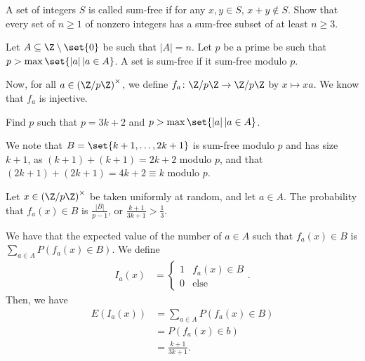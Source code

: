 \documentclass[10pt]{mypackage}
\begin{document}
\begin{problem}
  A set of integers $S$ is called sum-free if for any $x,y\in S$, $x+y\notin S$. Show that every set of $n\geq 1$ of nonzero integers has a sum-free subset of at least $n\geq 3$.
\end{problem}
\begin{solution}
  Let $A\subseteq \Z\setminus \set{0}$ be such that $\left\vert A \right\vert = n$. Let $p$ be a prime be such that $p > \max\set{\left\vert a \right\vert | a\in A}$. A set is sum-free if it sum-free modulo $p$.\newline

  Now, for all $a\in \left( \Z/p\Z \right)^{\times}$, we define $f_a\colon \Z/p\Z\rightarrow \Z/p\Z$ by $x\mapsto xa$. We know that $f_a$ is injective.\newline

  Find $p$ such that $p = 3k + 2$ and $p > \max\set{\left\vert a \right\vert | a\in A}$.\newline

  We note that $B = \set{k+1,\dots,2k+1}$ is sum-free modulo $p$ and has size $k + 1$, as $\left( k+1 \right) + \left( k+1 \right) = 2k + 2$ modulo $p$, and that $\left( 2k+1 \right) + \left( 2k+1 \right) = 4k + 2 \equiv k$ modulo $p$.\newline

  Let $x\in \left( \Z/p\Z \right)^{\times}$ be taken uniformly at random, and let $a\in A$. The probability that $f_a(x) \in B$ is $\frac{\left\vert B \right\vert}{p-1}$, or $\frac{k+1}{3k+1} > \frac{1}{3}$.\newline

  We have that the expected value of the number of $a\in A$ such that $f_a(x)\in B$ is $\sum_{a\in A}P\left( f_a(x)\in B \right)$. We define
  \begin{align*}
    I_a(x) &= \begin{cases}
      1 & f_a(x)\in B\\
      0 & \text{else}
    \end{cases}.
  \end{align*}
  Then, we have
  \begin{align*}
    E\left( I_a(x) \right) &= \sum_{a\in A}P\left( f_a(x)\in B \right)\\
                           &= P\left( f_a(x)\in b \right)\\
                           &= \frac{k+1}{3k+1}.
  \end{align*}
  
\end{solution}
\end{document}
